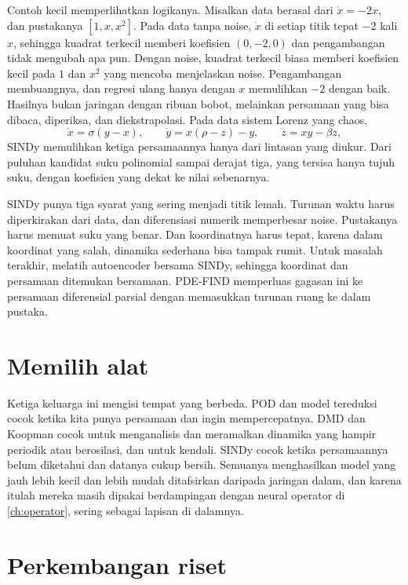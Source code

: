 Contoh kecil memperlihatkan logikanya. Misalkan data berasal dari $\dot x=-2x$, dan pustakanya
$[1,x,x^2]$. Pada data tanpa noise, $\dot x$ di setiap titik tepat $-2$ kali $x$, sehingga kuadrat
terkecil memberi koefisien $(0,-2,0)$ dan pengambangan tidak mengubah apa pun. Dengan noise, kuadrat
terkecil biasa memberi koefisien kecil pada $1$ dan $x^2$ yang mencoba menjelaskan noise. Pengambangan
membuangnya, dan regresi ulang hanya dengan $x$ memulihkan $-2$ dengan baik. Hasilnya bukan jaringan
dengan ribuan bobot, melainkan persamaan yang bisa dibaca, diperiksa, dan diekstrapolasi. Pada data
sistem Lorenz yang chaos,
\begin{equation}
\dot x=\sigma(y-x),\qquad \dot y=x(\rho-z)-y,\qquad \dot z=xy-\beta z,
\end{equation}
SINDy memulihkan ketiga persamaannya hanya dari lintasan yang diukur. Dari puluhan kandidat suku polinomial sampai
derajat tiga, yang tersisa hanya tujuh suku, dengan koefisien yang dekat ke nilai sebenarnya.

SINDy punya tiga syarat yang sering menjadi titik lemah. Turunan waktu harus diperkirakan dari data,
dan diferensiasi numerik memperbesar noise. Pustakanya harus memuat suku yang benar. Dan koordinatnya
harus tepat, karena dalam koordinat yang salah, dinamika sederhana bisa tampak rumit. Untuk masalah
terakhir, \citet{champion2019} melatih autoencoder bersama SINDy, sehingga koordinat dan persamaan
ditemukan bersamaan. PDE-FIND \citep{rudy2017} memperluas gagasan ini ke persamaan diferensial parsial
dengan memasukkan turunan ruang ke dalam pustaka.

\section{Memilih alat}

Ketiga keluarga ini mengisi tempat yang berbeda. POD dan model tereduksi cocok ketika kita punya
persamaan dan ingin mempercepatnya. DMD dan Koopman cocok untuk menganalisis dan meramalkan dinamika
yang hampir periodik atau berosilasi, dan untuk kendali. SINDy cocok ketika persamaannya belum diketahui
dan datanya cukup bersih. Semuanya menghasilkan model yang jauh lebih kecil dan lebih mudah ditafsirkan
daripada jaringan dalam, dan karena itulah mereka masih dipakai berdampingan dengan neural operator di
\cref{ch:operator}, sering sebagai lapisan di dalamnya.

\section{Perkembangan riset}

